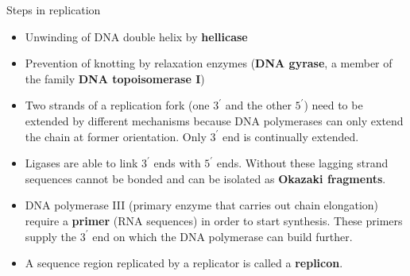 \documentclass[11pt,ignorenonframetext,aspectratio=169]{beamer}
\providecommand{\tightlist}{%
  \setlength{\itemsep}{0pt}\setlength{\parskip}{0pt}}
\begin{document}
\begin{frame}{Steps in replication}
\protect\hypertarget{steps-in-replication}{}
\begin{itemize}
\tightlist
\item
  Unwinding of DNA double helix by \textbf{hellicase}
\item
  Prevention of knotting by relaxation enzymes (\textbf{DNA gyrase}, a
  member of the family \textbf{DNA topoisomerase I})
\item
  Two strands of a replication fork (one \(3^{\prime}\) and the other
  \(5^{\prime}\)) need to be extended by different mechanisms because
  DNA polymerases can only extend the chain at former orientation. Only
  \(3^\prime\) end is continually extended.
\item
  Ligases are able to link \(3^\prime\) ends with \(5^\prime\) ends.
  Without these lagging strand sequences cannot be bonded and can be
  isolated as \textbf{Okazaki fragments}.
\item
  DNA polymerase III (primary enzyme that carries out chain elongation)
  require a \textbf{primer} (RNA sequences) in order to start synthesis.
  These primers supply the \(3^\prime\) end on which the DNA polymerase
  can build further.
\item
  A sequence region replicated by a replicator is called a
  \textbf{replicon}.
\end{itemize}
\end{frame}
\end{document}
